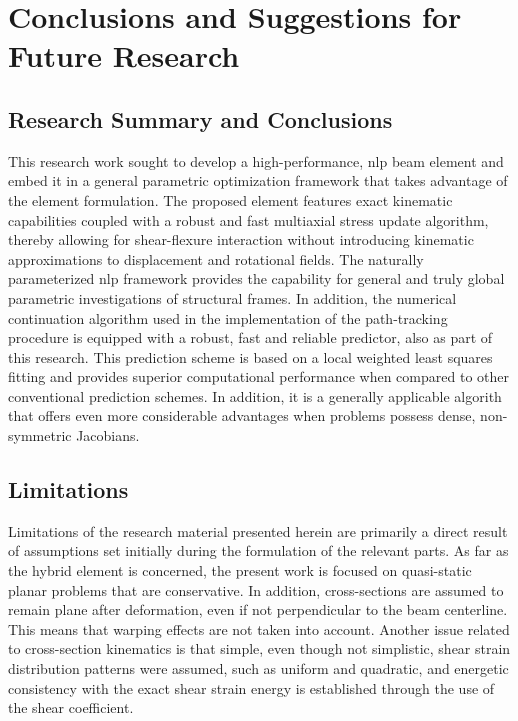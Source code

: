\chapter{Conclusions and Suggestions for Future Research}

\section{Research Summary and Conclusions}
This research work sought to develop a high-performance, \acrshort{nlp} beam 
element 
and embed it in a general parametric optimization framework that takes 
advantage of 
the element formulation. The proposed element features exact kinematic 
capabilities 
coupled with a robust and fast multiaxial stress update algorithm, thereby 
allowing 
for shear-flexure interaction without introducing kinematic approximations to 
displacement and rotational fields. The naturally parameterized \acrshort{nlp} 
framework provides the capability for general and truly global parametric 
investigations of structural frames. In addition, the numerical continuation 
algorithm 
used in the implementation of the path-tracking procedure is equipped with a 
robust, 
fast and reliable predictor, also as part of this research. This prediction 
scheme is 
based on a local weighted least squares fitting and provides superior 
computational 
performance when compared to other conventional prediction schemes. In 
addition, it is 
a generally applicable algorith that offers even more considerable advantages 
when 
problems possess dense, non-symmetric Jacobians.

\section{Limitations}

Limitations of the research material presented herein are primarily a direct 
result of 
assumptions set initially during the formulation of the relevant parts. As far 
as the 
hybrid element is concerned, the present work is focused on quasi-static planar 
problems that are conservative. In addition, cross-sections are assumed to 
remain 
plane after deformation, even if not perpendicular to the beam centerline. This 
means 
that warping effects are not taken into account. Another issue related to 
cross-section 
kinematics is that simple, even though not simplistic, shear strain 
distribution 
patterns 
were assumed, such as uniform and quadratic, and energetic consistency with the 
exact 
shear strain energy is established through the use of the shear coefficient.

